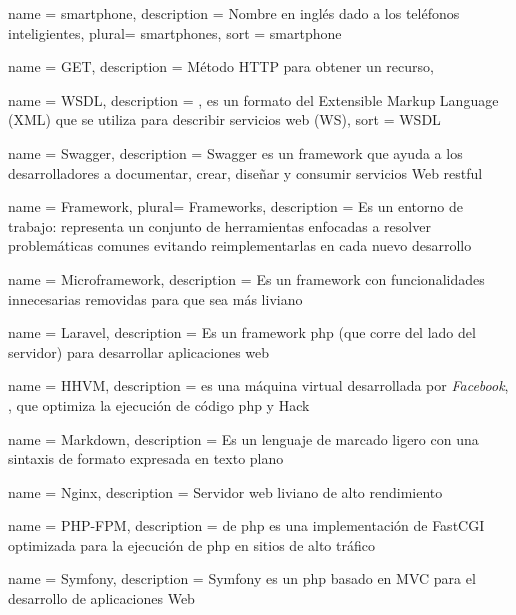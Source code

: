  {
  name = {smartphone},
  description = {Nombre en inglés dado a los teléfonos inteligientes},
  plural= {smartphones},
  sort = {smartphone}
}

 {
  name = {GET},
  description = {Método HTTP para obtener un recurso},
}

 {
  name = {WSDL},
  description = {, es un formato del Extensible Markup Language (XML) que se utiliza para describir servicios web (WS)},
  sort = {WSDL}
}

 {
  name = {Swagger},
  description = {Swagger es un \gls{framework} que ayuda a los desarrolladores a documentar, crear, diseñar y consumir servicios Web \gls{restful}}
}

 {
  name = {Framework},
  plural= {Frameworks},
  description = {Es un entorno de trabajo: representa un conjunto de herramientas enfocadas a resolver problemáticas comunes evitando reimplementarlas en cada nuevo desarrollo}
}

 {
  name = {Microframework},
  description = {Es un \gls{framework} con funcionalidades innecesarias removidas para que sea más liviano}
}


 {
  name = {Laravel},
  description = {Es un \gls{framework} \gls{php} (que corre del lado del servidor) para desarrollar aplicaciones web}
}

 {
  name = {HHVM},
  description = { es una máquina virtual desarrollada por \textit{Facebook}, , que optimiza la ejecución de código \gls{php} y Hack}
}

 {
  name = {Markdown},
  description = {Es un lenguaje de marcado ligero con una sintaxis de formato expresada en texto plano}
}

 {
  name = {Nginx},
  description = {Servidor web liviano de alto rendimiento}
}

 {
  name = {PHP-FPM},
  description = { de \gls{php} es una implementación de FastCGI optimizada para la ejecución de \gls{php} en sitios de alto tráfico}
}

 {
  name = {Symfony},
  description = {Symfony es un  \gls{php} basado en MVC para el desarrollo de aplicaciones Web}
}

